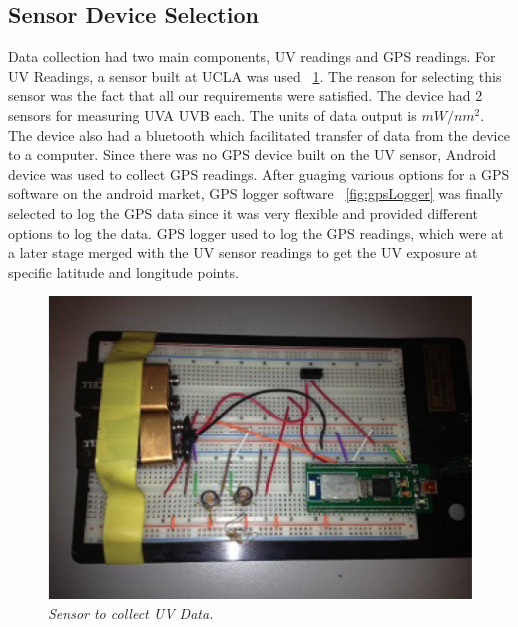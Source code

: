 \documentclass[12pt,fullpage,doublespace]{article}
\begin{document}
\subsection{Sensor Device Selection}
Data collection had two main components, UV readings and GPS readings. For UV Readings, a sensor built at UCLA was used ~\ref{fig:uvSensor}. The reason for selecting this sensor was the fact that all our requirements were satisfied. The device had 2 sensors for measuring UVA  UVB each. The units of data output is $mW/nm^2$. The device also had a bluetooth which facilitated transfer of data from the device to a computer. Since there was no GPS device built on the UV sensor, Android device was used to collect GPS readings. After guaging various options for a GPS software on the android market, GPS logger software ~\ref{fig:gpsLogger} was finally selected to log the GPS data since it was very flexible and provided different options to log the data. GPS logger used to log the GPS readings, which were at a later stage merged with the UV sensor readings to get the UV exposure at specific latitude and longitude points. 
\begin{figure}
\begin{center}
\includegraphics[scale=0.55]{uvSensor.png}
\caption{\small \sl Sensor to collect UV Data.\label{fig:uvSensor}}
\end{center}
\end{figure}
\end{document}
